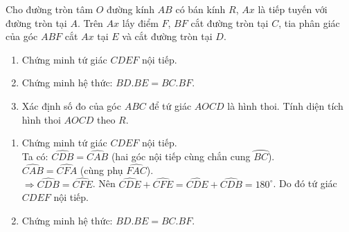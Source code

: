 \begin{ex}%
    Cho đường tròn tâm $O$ đường kính $AB$ có bán kính $R$,  $Ax$ là tiếp tuyến với đường tròn tại $A$. Trên  $Ax$ lấy điểm $F$, $BF$ cắt đường tròn tại $C$, tia phân giác của góc $ABF$ cắt $Ax$ tại $E$ và cắt đường tròn tại $D$.   	
    \begin{enumerate}
        \item Chứng minh tứ giác $CDEF$ nội tiếp.
        \item Chứng minh hệ thức: $BD.BE = BC.BF$.
        \item Xác định số đo của góc $ABC$ để tứ giác $AOCD$ là hình thoi. Tính diện tích hình thoi $AOCD$ theo $R$.
    \end{enumerate}
\loigiai
    {
    	\begin{center}
    	\end{center}
    \begin{enumerate}
        \item Chứng minh tứ giác $CDEF$ nội tiếp.\\
        Ta có:
        $\widehat{CDB}=\widehat{CAB}$     (hai góc nội tiếp cùng chắn cung $\wideparen{BC}$).\\
        $\widehat{CAB}=\widehat{CFA}$ (cùng phụ $\widehat{FAC}$).\\
        $\Rightarrow \widehat{CDB}=\widehat{CFE}$.
        Nên $\widehat{CDE}+\widehat{CFE}=\widehat{CDE}+\widehat{CDB}={180}^ \circ$.	
        Do đó tứ giác $CDEF$ nội tiếp.
        \item Chứng minh hệ thức: $BD. BE = BC. BF$.\\

\end{enumerate}}
\end{ex}
